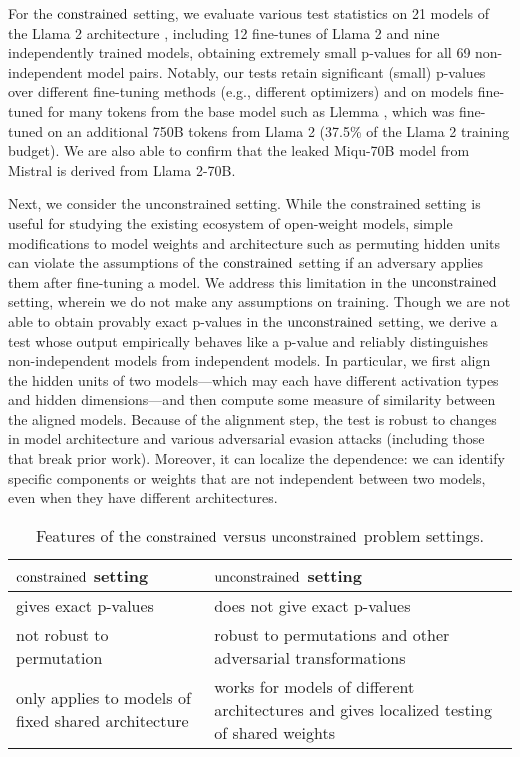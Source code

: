 For the $\textup{constrained}$ setting, we evaluate various test statistics on 21 models of the Llama 2 architecture \citep{touvron2023llama2openfoundation}, including 12 fine-tunes of Llama 2 and nine independently trained models, obtaining extremely small p-values for all 69 non-independent model pairs. Notably, our tests retain significant (small) p-values over different fine-tuning methods (e.g., different optimizers) and on models fine-tuned for many tokens from the base model such as Llemma \citep{azerbayev2024llemmaopenlanguagemodel}, which was fine-tuned on an additional 750B tokens from Llama 2 (37.5\% of the Llama 2 training budget). We are also able to confirm that the leaked Miqu-70B model from Mistral is derived from Llama 2-70B.

Next, we consider the unconstrained setting. While the constrained setting is useful for studying the existing ecosystem of open-weight models, simple modifications to model weights and architecture such as permuting hidden units can violate the assumptions of the $\textup{constrained}$ setting if an adversary applies them after fine-tuning a model.
We address this limitation in the $\textup{unconstrained}$ setting, wherein we do not make any assumptions on training.
Though we are not able to obtain provably exact p-values in the $\textup{unconstrained}$ setting, we derive a test whose output empirically behaves like a p-value and reliably distinguishes non-independent models from independent models.
In particular, we first align the hidden units of two models---which may each have different activation types and hidden dimensions---and then compute some measure of similarity between the aligned models. Because of the alignment step, the test is robust to changes in model architecture and various adversarial evasion attacks (including those that break prior work). Moreover, it can localize the dependence: we can identify specific components or weights that are not independent between two models, even when they have different architectures.

\begin{table}[]
    \centering
    \begin{tabular}{|p{7cm}|p{7cm}|}
    \hline 
        \textbf{$\textup{constrained}$ setting} & \textbf{$\textup{unconstrained}$ setting} \\ \hline 
        gives exact p-values & does not give exact p-values \\ \hline 
        not robust to permutation & robust to permutations and other adversarial transformations \\ \hline 
        only applies to models of fixed shared architecture & works for models of different architectures and gives localized testing of shared weights \\ \hline 
    \end{tabular}
    \caption{Features of the $\textup{constrained}$ versus $\textup{unconstrained}$ problem settings.
    }
    \label{tab:two_settings}
\end{table}

